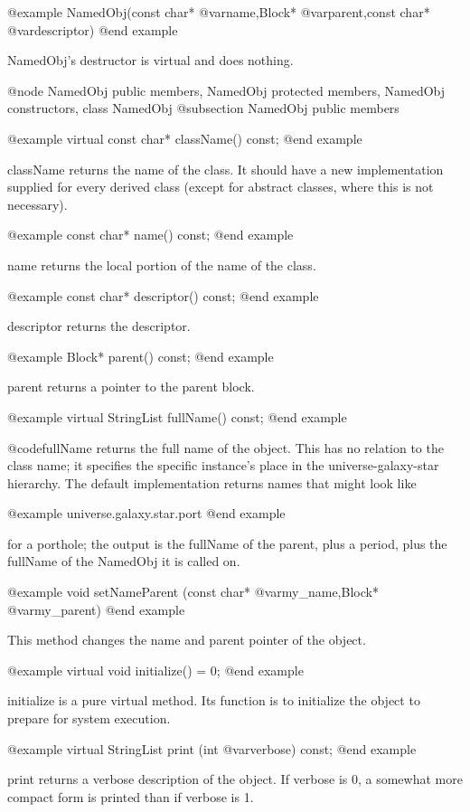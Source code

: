 @example
NamedObj(const char* @var{name},Block* @var{parent},const char* @var{descriptor})
@end example

NamedObj's destructor is virtual and does nothing.

@node NamedObj public members, NamedObj protected members, NamedObj constructors, class NamedObj
@subsection NamedObj public members

@example
virtual const char* className() const;
@end example

className returns the name of the class.  It should have a new
implementation supplied for every derived class (except for abstract
classes, where this is not necessary).

@example
const char* name() const;
@end example

name returns the local portion of the name of the class.

@example
const char* descriptor() const;
@end example

descriptor returns the descriptor.

@example
Block* parent() const;
@end example

parent returns a pointer to the parent block.

@example
virtual StringList fullName() const;
@end example

@code{fullName} returns the full name of the object.  This has no
relation to the class name; it specifies the specific instance's place
in the universe-galaxy-star hierarchy.  The default
implementation returns names that might look like

@example
universe.galaxy.star.port
@end example

for a porthole; the output is the fullName of the parent, plus a period,
plus the fullName of the NamedObj it is called on.

@example
void setNameParent (const char* @var{my_name},Block* @var{my_parent})
@end example

This method changes the name and parent pointer of the object.

@example
virtual void initialize() = 0;
@end example

initialize is a pure virtual method.  Its function is to initialize the
object to prepare for system execution.

@example
virtual StringList print (int @var{verbose}) const;
@end example

print returns a verbose description of the object.  If verbose is 0, a
somewhat more compact form is printed than if verbose is 1.

